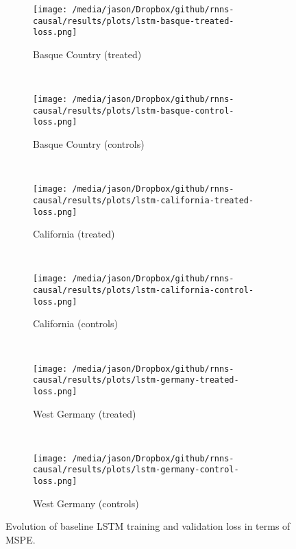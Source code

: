 \documentclass[12pt]{article}
\begin{document}
\begin{figure*}[htbp]
    \centering
    \begin{subfigure}[t]{0.4\textwidth}
        \centering
        \texttt{[image: /media/jason/Dropbox/github/rnns-causal/results/plots/lstm-basque-treated-loss.png]}
        \caption{Basque Country (treated)}
    \end{subfigure}
    ~ 
        \begin{subfigure}[t]{0.4\textwidth}
        \centering
        \texttt{[image: /media/jason/Dropbox/github/rnns-causal/results/plots/lstm-basque-control-loss.png]}
        \caption{Basque Country (controls)}
    \end{subfigure}
    ~ %
    \begin{subfigure}[t]{0.4\textwidth}
        \centering
        \texttt{[image: /media/jason/Dropbox/github/rnns-causal/results/plots/lstm-california-treated-loss.png]}
        \caption{California (treated)}
    \end{subfigure}
            ~ 
                \begin{subfigure}[t]{0.4\textwidth}
        \centering
        \texttt{[image: /media/jason/Dropbox/github/rnns-causal/results/plots/lstm-california-control-loss.png]}
        \caption{California (controls)}
    \end{subfigure}
            ~ %
    \begin{subfigure}[t]{0.4\textwidth}
        \centering
        \texttt{[image: /media/jason/Dropbox/github/rnns-causal/results/plots/lstm-germany-treated-loss.png]}
        \caption{West Germany (treated)}
    \end{subfigure}
            ~ 
    \begin{subfigure}[t]{0.4\textwidth}
        \centering
        \texttt{[image: /media/jason/Dropbox/github/rnns-causal/results/plots/lstm-germany-control-loss.png]}
        \caption{West Germany (controls)}
    \end{subfigure}
\caption{Evolution of baseline LSTM training and validation loss in terms of MSPE. \label{lstm-loss-scm}} 
\end{figure*}
\end{document}
